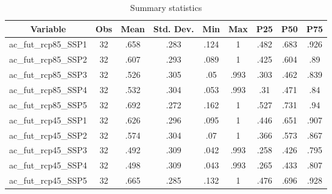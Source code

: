 \begin{table}[htbp]\centering \caption{Summary statistics\label{sumstat}}
\begin{tabular}{l c c c c c c c c}\hline\hline
\multicolumn{1}{c}{Variable} & Obs & Mean & Std. Dev.
 & Min & Max & P25 & P50 & P75  \\ \hline
ac\_fut\_rcp85\_SSP1 & 32 & .658 & .283 & .124 & 1 & .482 & .683 & .926 \\
ac\_fut\_rcp85\_SSP2 & 32 & .607 & .293 & .089 & 1 & .425 & .604 & .89 \\
ac\_fut\_rcp85\_SSP3 & 32 & .526 & .305 & .05 & .993 & .303 & .462 & .839 \\
ac\_fut\_rcp85\_SSP4 & 32 & .532 & .304 & .053 & .993 & .31 & .471 & .84 \\
ac\_fut\_rcp85\_SSP5 & 32 & .692 & .272 & .162 & 1 & .527 & .731 & .94 \\
ac\_fut\_rcp45\_SSP1 & 32 & .626 & .296 & .095 & 1 & .446 & .651 & .907 \\
ac\_fut\_rcp45\_SSP2 & 32 & .574 & .304 & .07 & 1 & .366 & .573 & .867 \\
ac\_fut\_rcp45\_SSP3 & 32 & .492 & .309 & .042 & .993 & .258 & .426 & .795 \\
ac\_fut\_rcp45\_SSP4 & 32 & .498 & .309 & .043 & .993 & .265 & .433 & .807 \\
ac\_fut\_rcp45\_SSP5 & 32 & .665 & .285 & .132 & 1 & .476 & .696 & .928 \\
\hline\end{tabular}
\end{table}
